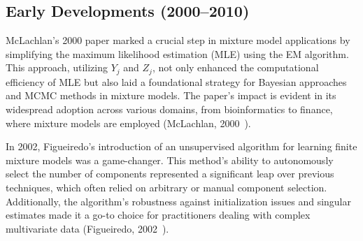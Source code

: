 \documentclass{article}
\begin{document}



%

\subsection*{Early Developments (2000--2010)}

McLachlan's 2000 paper marked a crucial step in mixture model applications by simplifying the maximum likelihood estimation (MLE) using the EM algorithm. This approach, utilizing $Y_j$ and $Z_j$, not only enhanced the computational efficiency of MLE but also laid a foundational strategy for Bayesian approaches and MCMC methods in mixture models. The paper’s impact is evident in its widespread adoption across various domains, from bioinformatics to finance, where mixture models are employed (McLachlan, 2000~\cite{mclachlan2000finite}).

In 2002, Figueiredo's introduction of an unsupervised algorithm for learning finite mixture models was a game-changer. This method's ability to autonomously select the number of components represented a significant leap over previous techniques, which often relied on arbitrary or manual component selection. Additionally, the algorithm's robustness against initialization issues and singular estimates made it a go-to choice for practitioners dealing with complex multivariate data (Figueiredo, 2002~\cite{figueiredo2002unsupervised}).
\end{document}
